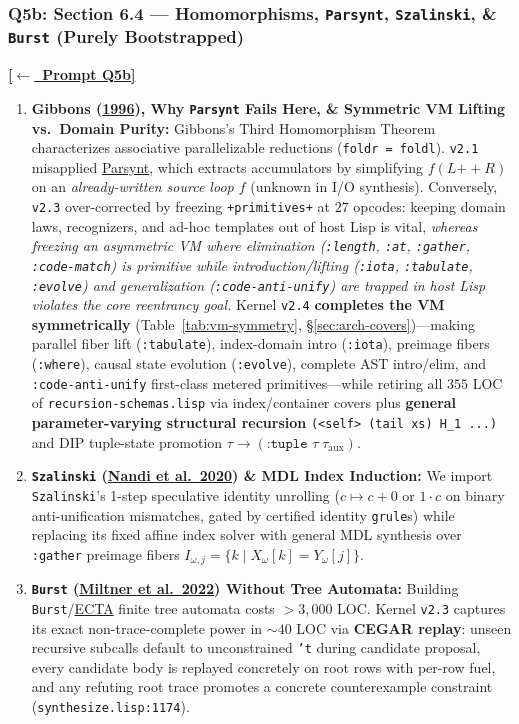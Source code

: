 \documentclass[12pt]{article}
\newcommand{\ansback}[2]{\hyperlink{#1}{\textcolor{qpurple}{\textbf{\small[\(\leftarrow\)~#2]}}}}
\newcommand{\litref}[2]{\hyperlink{lit:#1}{\textcolor{citegreen}{#2}}}
\begin{document}
\subsubsection{Q5b: Section 6.4 --- Homomorphisms, \texttt{Parsynt}, \texttt{Szalinski}, \& \texttt{Burst} (Purely Bootstrapped)}
\label{ans:5b}

\ansback{q:5b}{Prompt Q5b}
\begin{enumerate}[leftmargin=1.6em, itemsep=0.2em]
  \item \textbf{Gibbons (\litref{gibbons1996}{1996}), Why \texttt{Parsynt} Fails Here, \& Symmetric VM Lifting vs.\ Domain Purity:} Gibbons's Third Homomorphism Theorem characterizes associative parallelizable reductions (\texttt{foldr = foldl}). \texttt{v2.1} misapplied \litref{farzan2017}{Parsynt}, which extracts accumulators by simplifying $f(L \mathbin{+\!\!+} R)$ on an \emph{already-written source loop $f$} (unknown in I/O synthesis). Conversely, \texttt{v2.3} over-corrected by freezing \texttt{+primitives+} at $27$ opcodes: keeping domain laws, recognizers, and ad-hoc templates out of host Lisp is vital, \emph{whereas freezing an asymmetric VM where elimination (\texttt{:length}, \texttt{:at}, \texttt{:gather}, \texttt{:code-match}) is primitive while introduction/lifting (\texttt{:iota}, \texttt{:tabulate}, \texttt{:evolve}) and generalization (\texttt{:code-anti-unify}) are trapped in host Lisp violates the core reentrancy goal.} Kernel \texttt{v2.4} \textbf{completes the VM symmetrically} (Table~\ref{tab:vm-symmetry}, \S\ref{sec:arch-covers})---making parallel fiber lift (\texttt{:tabulate}), index-domain intro (\texttt{:iota}), preimage fibers (\texttt{:where}), causal state evolution (\texttt{:evolve}), complete AST intro/elim, and \texttt{:code-anti-unify} first-class metered primitives---while retiring all $355$ LOC of \texttt{recursion-schemas.lisp} via index/container covers plus \textbf{general parameter-varying structural recursion} \texttt{(<self> (tail xs) H\_1 ...)} and DIP tuple-state promotion $\tau \to (\texttt{:tuple }\tau\;\tau_{\mathrm{aux}})$.
  \item \textbf{\texttt{Szalinski} (\litref{nandi2020}{Nandi et al.\ 2020}) \& MDL Index Induction:} We import \texttt{Szalinski}'s 1-step speculative identity unrolling ($c \mapsto c + 0$ or $1 \cdot c$ on binary anti-unification mismatches, gated by certified identity \texttt{grule}s) while replacing its fixed affine index solver with general MDL synthesis over \texttt{:gather} preimage fibers $I_{\omega,j} = \{k \mid X_\omega[k] = Y_\omega[j]\}$.
  \item \textbf{\texttt{Burst} (\litref{miltner2022}{Miltner et al.\ 2022}) Without Tree Automata:} Building \texttt{Burst}/\litref{koppel2022}{ECTA} finite tree automata costs $>3,000$ LOC. Kernel \texttt{v2.3} captures its exact non-trace-complete power in $\sim 40$ LOC via \textbf{CEGAR replay}: unseen recursive subcalls default to unconstrained \texttt{'t} during candidate proposal, every candidate body is replayed concretely on root rows with per-row fuel, and any refuting root trace promotes a concrete counterexample constraint (\texttt{synthesize.lisp:1174}).
\end{enumerate}
\end{document}

